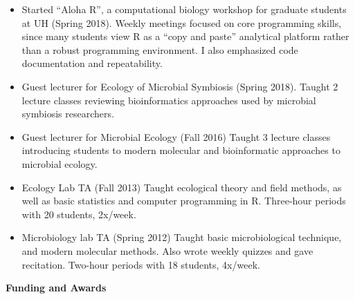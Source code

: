 \documentclass{article}
\def\yen{{\setbox0=\hbox{Y}Y\kern-.97\wd0\vbox{\hrule height.1ex
  width.98\wd0\kern.33ex\hrule height.1ex width.98\wd0\kern.45ex}}}
\begin{document}
\begin{itemize}[noitemsep,topsep=0pt, leftmargin=5mm]
  \item Started “Aloha R”, a computational biology workshop for graduate students at UH (Spring 2018). Weekly meetings focused on core programming skills, since many students view R as a “copy and paste” analytical platform rather than a robust programming environment. I also emphasized code documentation and repeatability.
  \item Guest lecturer for Ecology of Microbial Symbiosis (Spring 2018). Taught 2 lecture classes reviewing bioinformatics approaches used by microbial symbiosis researchers.
  \item Guest lecturer for Microbial Ecology (Fall 2016) Taught 3 lecture classes introducing students to modern molecular and bioinformatic approaches to microbial ecology.
  \item Ecology Lab TA (Fall 2013) Taught ecological theory and field methods, as well as basic statistics and computer programming in R. Three-hour periods with 20 students, 2x/week.
  \item Microbiology lab TA (Spring 2012) Taught basic microbiological technique, and modern molecular methods.
Also wrote weekly quizzes and gave recitation. Two-hour periods with 18 students, 4x/week.
\end{itemize}
\vspace{3mm}
{\large  \textbf{Funding and Awards}}
\end{document}
